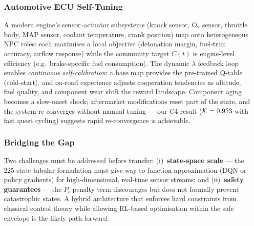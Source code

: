 \subsubsection{Automotive ECU Self-Tuning}
A modern engine's sensor--actuator subsystems (knock sensor, O$_2$ sensor, throttle body, MAP sensor, coolant temperature, crank position) map onto heterogeneous NPC roles: each maximises a local objective (detonation margin, fuel-trim accuracy, airflow response) while the community target $C(t)$ is engine-level efficiency (e.g.\ brake-specific fuel consumption). The dynamic $\lambda$ feedback loop enables \emph{continuous self-calibration}: a base map provides the pre-trained Q-table (cold-start), and on-road experience adjusts cooperation tendencies as altitude, fuel quality, and component wear shift the reward landscape. Component aging becomes a slow-onset shock; aftermarket modifications reset part of the state, and the system re-converges without manual tuning --- our C4 result ($\mathcal{K} = 0.953$ with fast quest cycling) suggests rapid re-convergence is achievable.

\subsubsection{Bridging the Gap}
Two challenges must be addressed before transfer: (i)~\textbf{state-space scale} --- the 225-state tabular formulation must give way to function approximation (DQN or policy gradients) for high-dimensional, real-time sensor streams; and (ii)~\textbf{safety guarantees} --- the $P_i$ penalty term discourages but does not formally prevent catastrophic states. A hybrid architecture that enforces hard constraints from classical control theory while allowing RL-based optimisation within the safe envelope is the likely path forward.
